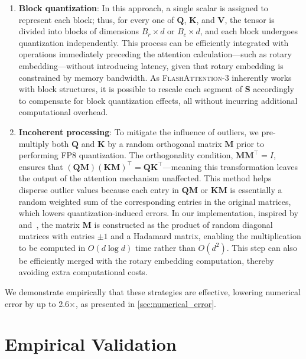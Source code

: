 \begin{enumerate}

\item \textbf{Block quantization}: In this approach, a single scalar is assigned to represent each block; thus, for every one of $\mathbf{Q}$, $\mathbf{K}$, and $\mathbf{V}$, the tensor is divided into blocks of dimensions $B_r \times d$ or $B_c \times d$, and each block undergoes quantization independently. This process can be efficiently integrated with operations immediately preceding the attention calculation—such as rotary embedding—without introducing latency, given that rotary embedding is constrained by memory bandwidth. As \textsc{FlashAttention-3} inherently works with block structures, it is possible to rescale each segment of $\mathbf{S}$ accordingly to compensate for block quantization effects, all without incurring additional computational overhead.

\item \textbf{Incoherent processing}: To mitigate the influence of outliers, we pre-multiply both $\mathbf{Q}$ and $\mathbf{K}$ by a random orthogonal matrix $\mathbf{M}$ prior to performing FP8 quantization. The orthogonality condition, $\mathbf{M} \mathbf{M}^\top = I$, ensures that $(\mathbf{Q} \mathbf{M}) (\mathbf{K} \mathbf{M})^\top = \mathbf{Q} \mathbf{K}^\top$—meaning this transformation leaves the output of the attention mechanism unaffected. This method helps disperse outlier values because each entry in $\mathbf{Q} \mathbf{M}$ or $\mathbf{K} \mathbf{M}$ is essentially a random weighted sum of the corresponding entries in the original matrices, which lowers quantization-induced errors. In our implementation, inspired by \citet{chee2024quip} and~\citet{tseng2024quip}, the matrix $\mathbf{M}$ is constructed as the product of random diagonal matrices with entries $\pm 1$ and a Hadamard matrix, enabling the multiplication to be computed in $O(d \log d)$ time rather than $O(d^2)$. This step can also be efficiently merged with the rotary embedding computation, thereby avoiding extra computational costs.

\end{enumerate}

We demonstrate empirically that these strategies are effective, lowering numerical error by up to 2.6$\times$, as presented in \cref{sec:numerical_error}.

\section{Empirical Validation}
\label{sec:exp}


